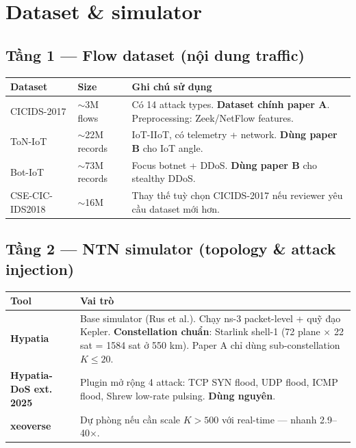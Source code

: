 \documentclass[11pt,a4paper]{article}
\begin{document}
\section{Dataset \& simulator}

\subsection{Tầng 1 --- Flow dataset (nội dung traffic)}

\begin{longtable}{@{}p{3cm} p{3cm} p{9cm}@{}}
\toprule
\textbf{Dataset} & \textbf{Size} & \textbf{Ghi chú sử dụng} \\
\midrule
\endhead
CICIDS-2017 & $\sim$3M flows & Có 14 attack types. \textbf{Dataset chính paper A}. Preprocessing: Zeek/NetFlow features. \\
ToN-IoT & $\sim$22M records & IoT-IIoT, có telemetry + network. \textbf{Dùng paper B} cho IoT angle. \\
Bot-IoT & $\sim$73M records & Focus botnet + DDoS. \textbf{Dùng paper B} cho stealthy DDoS. \\
CSE-CIC-IDS2018 & $\sim$16M & Thay thế tuỳ chọn CICIDS-2017 nếu reviewer yêu cầu dataset mới hơn. \\
\bottomrule
\end{longtable}

\subsection{Tầng 2 --- NTN simulator (topology \& attack injection)}

\begin{longtable}{@{}p{3cm} p{12cm}@{}}
\toprule
\textbf{Tool} & \textbf{Vai trò} \\
\midrule
\endhead
\textbf{Hypatia} & Base simulator (Rus et al.). Chạy ns-3 packet-level + quỹ đạo Kepler. \textbf{Constellation chuẩn}: Starlink shell-1 (72 plane $\times$ 22 sat = 1584 sat ở 550 km). Paper A chỉ dùng sub-constellation $K \leq 20$. \\
\textbf{Hypatia-DoS ext. 2025} & Plugin mở rộng 4 attack: TCP SYN flood, UDP flood, ICMP flood, Shrew low-rate pulsing. \textbf{Dùng nguyên}. \\
\textbf{xeoverse} & Dự phòng nếu cần scale $K > 500$ với real-time --- nhanh 2.9--40$\times$. \\
\bottomrule
\end{longtable}
\end{document}

